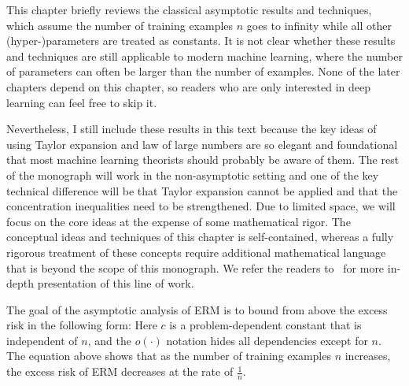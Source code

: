 \setcounter{section}{0}


This chapter briefly reviews the classical asymptotic results and techniques, which assume the number of training examples $n$ goes to infinity while all other (hyper-)parameters are treated as constants. It is not clear whether these results and techniques are still applicable to modern machine learning, where the number of parameters can often be larger than the number of examples. None of the later chapters depend on this chapter, so readers who are only interested in deep learning can feel free to skip it.  

Nevertheless, I still include these results in this text because the key ideas of using Taylor expansion and law of large numbers are so elegant and foundational that most machine learning theorists should probably be aware of them. 
The rest of the monograph will work in the non-asymptotic setting and one of the key technical difference will be that Taylor expansion cannot be applied and that the concentration inequalities need to be strengthened. 
Due to limited space, we will focus on the core ideas at the expense of some mathematical rigor. The conceptual ideas and techniques of this chapter is self-contained, whereas a fully rigorous treatment of these concepts require additional mathematical language that is beyond the scope of this monograph. We refer the readers to~\citep{vaart_1998} for more in-depth presentation of this line of work. 






The goal of the asymptotic analysis of ERM is to bound from above the excess risk in the following form:
Here $c$ is a problem-dependent constant that is independent of $n$, and the $o(\cdot)$ notation hides all dependencies except for $n$. The equation above shows that as the number of training examples $n$ increases, the excess risk of ERM decreases at the rate of $\frac{1}{n}$.

